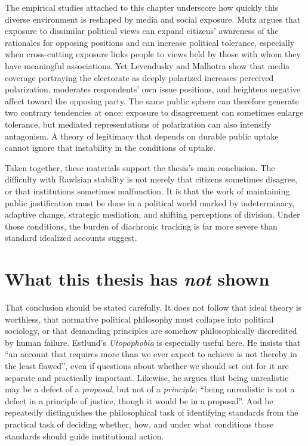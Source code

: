 \documentclass[12pt]{report}
\begin{document}
The empirical studies attached to this chapter underscore how quickly this diverse environment is reshaped by media and social exposure. Mutz argues that exposure to dissimilar political views can expand citizens' awareness of the rationales for opposing positions and can increase political tolerance, especially when cross-cutting exposure links people to views held by those with whom they have meaningful associations. \parencite[pp.~111--114]{mutz2002crosscutting}
Yet Levendusky and Malhotra show that media coverage portraying the electorate as deeply polarized increases perceived polarization, moderates respondents' own issue positions, and heightens negative affect toward the opposing party. \parencite[pp.~283--284, 291--293]{levendusky2016media}
The same public sphere can therefore generate two contrary tendencies at once: exposure to disagreement can sometimes enlarge tolerance, but mediated representations of polarization can also intensify antagonism. A theory of legitimacy that depends on durable public uptake cannot ignore that instability in the conditions of uptake.

Taken together, these materials support the thesis's main conclusion. The difficulty with Rawlsian stability is not merely that citizens sometimes disagree, or that institutions sometimes malfunction. It is that the work of maintaining public justification must be done in a political world marked by indeterminacy, adaptive change, strategic mediation, and shifting perceptions of division. Under those conditions, the burden of diachronic tracking is far more severe than standard idealized accounts suggest.

\section{What this thesis has \emph{not} shown}

That conclusion should be stated carefully. It does not follow that ideal theory is worthless, that normative political philosophy must collapse into political sociology, or that demanding principles are somehow philosophically discredited by human failure. Estlund's \emph{Utopophobia} is especially useful here. He insists that \enquote{an account that requires more than we ever expect to achieve is not thereby in the least flawed}, even if questions about whether we should set out for it are separate and practically important. \parencite[p.~4]{estlund2019utopophobia}
Likewise, he argues that being unrealistic may be a defect of a \emph{proposal}, but not of a \emph{principle}; \enquote{being unrealistic is not a defect in a principle of justice, though it would be in a proposal}. \parencite[p.~12]{estlund2019utopophobia}
And he repeatedly distinguishes the philosophical task of identifying standards from the practical task of deciding whether, how, and under what conditions those standards should guide institutional action. \parencite[pp.~4, 10--12]{estlund2019utopophobia}
\end{document}
